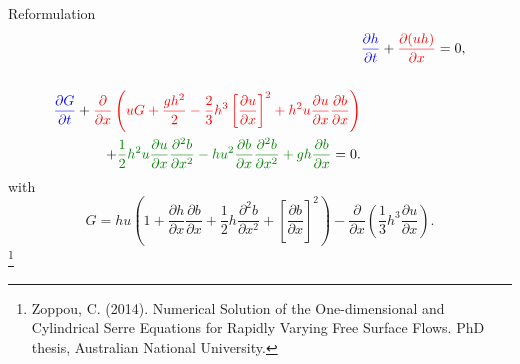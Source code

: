 \documentclass[]{beamer}
\newcommand\blfootnote[1]{%
	\begingroup
	\renewcommand\thefootnote{}\footnote{#1}%
	\addtocounter{footnote}{-1}%
	\endgroup
}
\begin{document}
\begin{frame}{Reformulation}
	\begin{align*}
	& {\color{blue}\frac{\partial h}{\partial t}} + {\color{red}\dfrac{\partial (uh)}{\partial x}} = 0,  \\ \nonumber \\
	\begin{split}
	{\color{blue}\frac{\partial G}{\partial t} }  + {\color{red}\frac{\partial}{\partial x} \left( {u} G + \frac{gh^2}{2} - \frac{2}{3}h^3 \left[\frac{\partial {u}}{\partial x}\right]^2 + h^2 {u}\frac{\partial {u}}{\partial x}\frac{\partial b}{\partial x} \right)} \\ + {\color{green!50!black}\frac{1}{2}h^2 {u} \frac{\partial {u}}{\partial x} \frac{\partial^2 b}{\partial x^2}  - h {u}^2\frac{\partial b}{\partial x}\frac{\partial^2 b}{\partial x^2} + gh\frac{\partial b}{\partial x} } = 0 .
	\end{split}
	\end{align*}
	with
	\[ G =  h {u} \left(1 + \frac{\partial h}{\partial x}\frac{\partial b}{\partial x} + \frac{1}{2}h\frac{\partial^2 b}{\partial x^2} + \left[\frac{\partial b}{\partial x}\right]^2 \right) - \frac{\partial}{\partial x}\left(\frac{1}{3}h^3  \frac{\partial {u}}{\partial x}\right).\]
	\blfootnote{Zoppou, C. (2014).
		Numerical Solution of the One-dimensional and Cylindrical
		Serre Equations for Rapidly Varying Free Surface Flows. PhD thesis, Australian National University.}
\end{frame}
\end{document}
